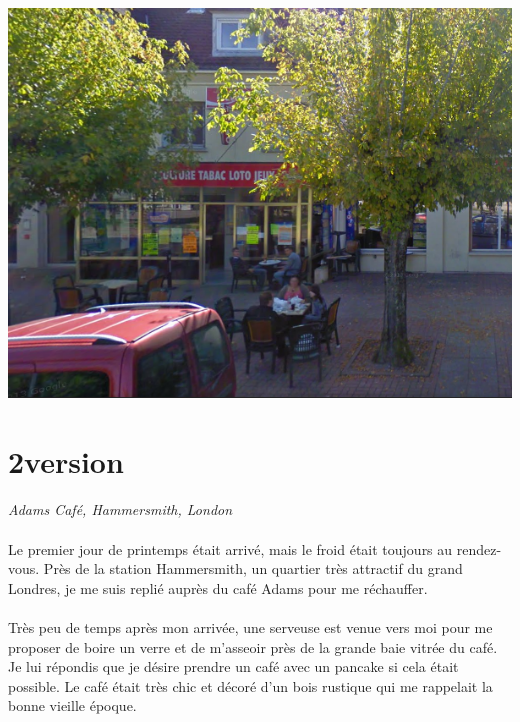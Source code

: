 \begin{center}
	\includegraphics[scale=0.5]{BarArcis.png}
\end{center}

\section{2\ieme version}

\paragraph{}
\emph{Adams Café, Hammersmith, London}

\paragraph{} Le premier jour de printemps était arrivé, mais le froid était
toujours au rendez-vous. Près de la station Hammersmith, un quartier très
attractif du grand Londres, je me suis replié auprès du café Adams pour me
réchauffer.

\paragraph{} Très peu de temps après mon arrivée, une serveuse est venue vers
moi pour me proposer de boire un verre et de m'asseoir près de la grande baie
vitrée du café. Je lui répondis que je désire prendre un café avec un pancake
si cela était possible. Le café était très chic et décoré d'un bois rustique
qui me rappelait la bonne vieille époque.

